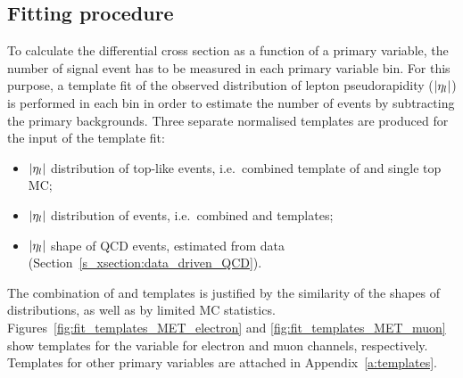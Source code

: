 \subsection{Fitting procedure}
\label{ss_xsection:fitting}
To calculate the differential cross section as a function of a primary variable, the number of signal \ttbar event has
to be measured in each primary variable bin. For this purpose, a template fit of the observed distribution of lepton
pseudorapidity ($\lvert \eta_l \rvert$) is performed in each bin in order to estimate the number of \ttbar events by
subtracting the primary backgrounds. Three separate normalised templates are produced for the input of the template fit:

\begin{itemize}
	\item $\lvert \eta_l \rvert$ distribution of top-like events, i.e.\ combined template of \ttbar and single top MC;
	\item $\lvert \eta_l \rvert$ distribution of \VpJets events, i.e.\ combined \WpJets and \ZpJets templates;
	\item $\lvert \eta_l \rvert$ shape of QCD events, estimated from data (Section~\ref{s_xsection:data_driven_QCD}).
\end{itemize}

The combination of \WpJets and \ZpJets templates is justified by the similarity of the shapes of distributions, as well
as by limited MC statistics. Figures~\ref{fig:fit_templates_MET_electron} and \ref{fig:fit_templates_MET_muon} show
templates for the \MET variable for electron and muon channels, respectively. Templates for other primary variables are
attached in Appendix~\ref{a:templates}.


